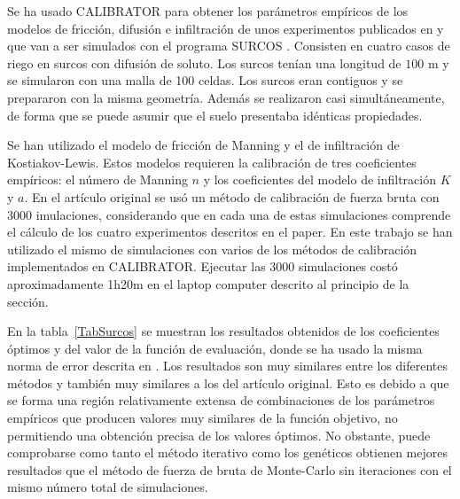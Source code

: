 \documentclass[review,authoryear]{elsarticle}
\begin{document}
Se ha usado CALIBRATOR para obtener los parámetros empíricos de los modelos de
fricción, difusión e infiltración de unos experimentos publicados en
\citet{JaviSurcos2} y que van a ser simulados con el programa SURCOS
\citep{Surcos,SurcosGit,JaviSurcos3}. Consisten en cuatro casos de riego en
surcos con difusión de soluto. Los surcos tenían una longitud de $100$ m y se simularon con una malla de 100 celdas. Los surcos eran contiguos y se prepararon
con la misma geometría. Además se realizaron casi simultáneamente, de forma que
se puede asumir que el suelo presentaba idénticas propiedades.

Se han utilizado el modelo de fricción de Manning y el de infiltración de
Kostiakov-Lewis. Estos modelos requieren la calibración de tres coeficientes
empíricos: el número de Manning $n$ y los coeficientes del modelo de
infiltración $K$ y $a$. En el artículo original se usó un método de calibración
de fuerza bruta con 3000  imulaciones, considerando que en cada una de estas
simulaciones comprende el cálculo de los cuatro experimentos descritos en el
paper. En este trabajo se han utilizado el mismo de simulaciones con varios de
los métodos de calibración implementados en CALIBRATOR. Ejecutar las 3000
simulaciones costó aproximadamente 1h20m en el laptop computer descrito al
principio de la sección.

En la tabla~\ref{TabSurcos} se muestran los resultados obtenidos de los
coeficientes óptimos y del valor de la función de evaluación,
donde se ha usado la misma norma de error descrita en \citet{JaviSurcos2}. Los
resultados son muy similares entre los diferentes métodos y también muy
similares a los del artículo original. Esto es debido a que se forma una región
relativamente extensa de combinaciones de los parámetros empíricos que producen
valores muy similares de la función objetivo, no permitiendo una obtención
precisa de los valores óptimos. No obstante, puede comprobarse como tanto el
método iterativo como los genéticos obtienen mejores resultados que el método de
fuerza de bruta de Monte-Carlo sin iteraciones con el mismo número total de
simulaciones.
\end{document}
